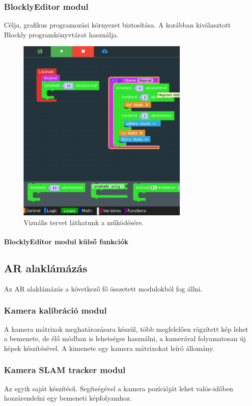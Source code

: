 \documentclass[12pt,a4paper,oneside]{report} %
\begin{document}
\subsubsection{BlocklyEditor modul}
Célja, grafikus programozási környezet biztosítása. A korábban kiválasztott Blockly programkönyvtárat használja. 
\begin{figure}[h]
	\label{fig:Block}
	\centering
	\includegraphics[width=0.75\textwidth]{2Vf5as}
	\caption{Vizuális tervet láthatunk a működésére.}
\end{figure}


\paragraph{BlocklyEditor modul külső funkciók}

\subsection{AR alaklámázás}
Az AR alaklámázás a következő fő összetett modulokból fog állni.
\subsubsection{Kamera kalibráció modul} 
A kamera mátrixok meghatározásara készül, több megfelelően rögzített kép lehet a bemenete, de élő módban is lehetséges használni, a kamerával folyamatosan új képek készítésével. A kimenete egy kamera mátrixokat leíró állomány.
\subsubsection{Kamera SLAM tracker modul}
Az egyik saját készítésű. Segítségével a kamera pozícióját lehet valós-időben hozzárendelni egy bemeneti képfolyamhoz.
\end{document}
